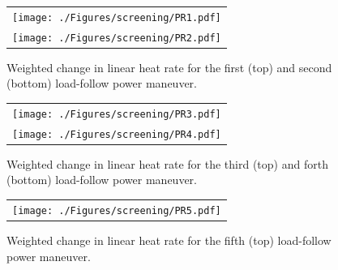 \documentclass[edeposit,fullpage,11pt]{uiucthesis2009}
\begin{document}
\begin{landscape}
\begin{figure}[h]
\begin{tabular}{c}
\texttt{[image: ./Figures/screening/PR1.pdf]} \\
\texttt{[image: ./Figures/screening/PR2.pdf]} \\
\end{tabular}
\caption{Weighted change in linear heat rate for the first (top) and second (bottom) load-follow power maneuver.}
\label{fig:lf_PR1}
\end{figure}
\end{landscape}

\begin{landscape}
\begin{figure}[h]
\begin{tabular}{c}
\texttt{[image: ./Figures/screening/PR3.pdf]} \\
\texttt{[image: ./Figures/screening/PR4.pdf]} \\
\end{tabular}
\caption{Weighted change in linear heat rate for the third (top) and forth (bottom) load-follow power maneuver.}
\label{fig:lf_PR2}
\end{figure}
\end{landscape}

\begin{landscape}
\begin{figure}[h]
\begin{tabular}{c}
\texttt{[image: ./Figures/screening/PR5.pdf]} \\
\end{tabular}
\caption{Weighted change in linear heat rate for the fifth (top) load-follow power maneuver.}
\label{fig:lf_PR3}
\end{figure}
\end{landscape}
\end{document}

